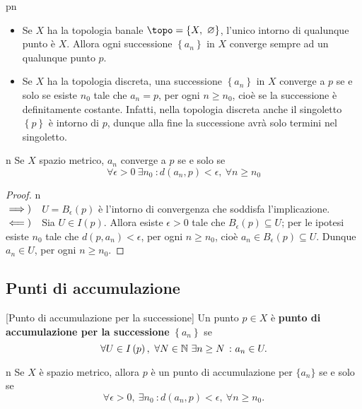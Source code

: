 \begin{example}{pn}~{}
	\begin{itemize}
		\item Se $X$ ha la topologia banale $\topo=\left\{X,\ \emptyset\right\}$, l'unico intorno di qualunque punto è $X$. Allora ogni successione $\left\{a_n\right\}$ in $X$ converge sempre ad un qualunque punto $p$.
		\item Se $X$ ha la topologia discreta, una successione $\left\{a_n\right\}$ in $X$ converge a $p$ se e solo se esiste $n_0$ tale che $a_n=p$, per ogni $n\geq n_0$, cioè se la successione è definitamente costante. Infatti, nella topologia discreta anche il singoletto $\left\{p\right\}$ è intorno di $p$, dunque alla fine la successione avrà solo termini nel singoletto.
	\end{itemize}
\end{example}
\begin{remark}{n}
Se $X$ spazio metrico, $a_n$ converge a $p$ se e solo se
\begin{equation*}
	\forall \epsilon>0\ \exists n_0\ \colon d\left(a_n,p\right)<\epsilon,\ \forall n\geq n_0
\end{equation*}
\end{remark}
\begin{proof}{n}~{}\\
	$\implies)\quad$$U=B_{\epsilon}\left(p\right)$ è l'intorno di convergenza che soddisfa l'implicazione.\\
	$\impliedby)\quad$Sia $U\in I\left(p\right)$. Allora esiste $\epsilon>0$ tale che $B_{\epsilon}\left(p\right)\subseteq U$; per le ipotesi esiste $n_0$ tale che $d\left(p,a_n\right)<\epsilon$, per ogni $n\geq n_0$, cioè $a_n\in B_{\epsilon}\left(p\right)\subseteq U$. Dunque $a_n\in U$, per ogni $n\geq n_0$.\qedhere
\end{proof}
\subsection{Punti di accumulazione}
\begin{definition}{}[Punto di accumulazione per la successione]
	Un punto $p\in X$ è \textbf{punto di accumulazione per la successione} $\left\{a_n\right\}$ se
	\begin{equation*}
		\forall U\in I\left(p\right),\ \forall N\in\mathbb{N}\ \exists n\geq N\ \colon a_n\in U.
	\end{equation*}
\end{definition}
\begin{exercise}{n}
	Se $X$ è spazio metrico, allora $p$ è un punto di accumulazione per $\{a_n\}$ se e solo se
	\begin{equation*}
		\forall \epsilon>0,\ \exists n_0\ \colon d\left(a_n,p\right)<\epsilon,\ \forall n\geq n_0.
	\end{equation*}
\end{exercise}

